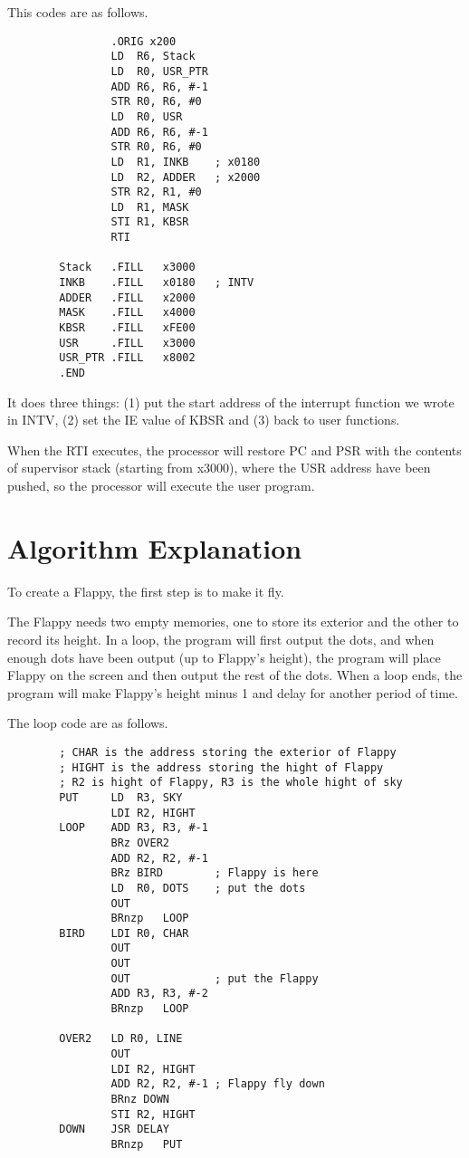 \documentclass[20pt]{ctexart}
\begin{document}
This codes are as follows.
\begin{verbatim}
                .ORIG x200
                LD  R6, Stack
                LD  R0, USR_PTR
                ADD R6, R6, #-1
                STR R0, R6, #0
                LD  R0, USR
                ADD R6, R6, #-1
                STR R0, R6, #0 
                LD  R1, INKB    ; x0180
                LD  R2, ADDER   ; x2000
                STR R2, R1, #0
                LD  R1, MASK
                STI R1, KBSR
                RTI

        Stack   .FILL   x3000
        INKB    .FILL   x0180   ; INTV
        ADDER   .FILL   x2000
        MASK    .FILL   x4000
        KBSR    .FILL   xFE00
        USR     .FILL   x3000
        USR_PTR .FILL   x8002
        .END
        \end{verbatim}

It does three things: (1) put the start address of the interrupt function we wrote in INTV, (2) set the IE value of KBSR and (3) back to user functions.

When the RTI executes, the processor will restore PC and PSR with the contents of supervisor stack (starting from x3000), where the USR address have been pushed, so the processor will execute the user program.

\section{Algorithm Explanation}
To create a Flappy, the first step is to make it fly.

The Flappy needs two empty memories, one to store its exterior and the other to record its height. In a loop, the program will first output the dots, and when enough dots have been output (up to Flappy's height), the program will place Flappy on the screen and then output the rest of the dots.
When a loop ends, the program will make Flappy's height minus 1 and delay for another period of time.

The loop code are as follows.
\begin{verbatim}
        ; CHAR is the address storing the exterior of Flappy
        ; HIGHT is the address storing the hight of Flappy
        ; R2 is hight of Flappy, R3 is the whole hight of sky
        PUT     LD  R3, SKY 
                LDI R2, HIGHT
        LOOP    ADD R3, R3, #-1
                BRz OVER2
                ADD R2, R2, #-1
                BRz BIRD        ; Flappy is here
                LD  R0, DOTS    ; put the dots
                OUT 
                BRnzp   LOOP
        BIRD    LDI R0, CHAR
                OUT
                OUT 
                OUT             ; put the Flappy
                ADD R3, R3, #-2
                BRnzp   LOOP
                
        OVER2   LD R0, LINE
                OUT
                LDI R2, HIGHT
                ADD R2, R2, #-1 ; Flappy fly down 
                BRnz DOWN
                STI R2, HIGHT  
        DOWN    JSR DELAY
                BRnzp   PUT
\end{verbatim}
\end{document}
